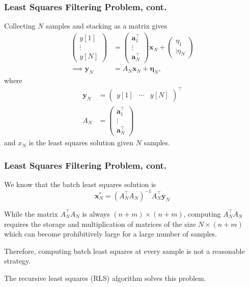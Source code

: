 \documentclass{beamer}
\begin{document}
\begin{frame}\frametitle{Least Squares Filtering Problem, cont.}

Collecting $N$ samples and stacking as a matrix gives
\begin{align*}
\begin{pmatrix} y[1] \\ \vdots \\ y[N] \end{pmatrix} &= \begin{pmatrix} \mathbf{a}_1^\top \\ \vdots \\ \mathbf{a}_N^\top\end{pmatrix}\mathbf{x}_N + \begin{pmatrix} \eta_1 \\ \vdots \eta_N \end{pmatrix} \\
\implies \mathbf{y}_N &= A_N \mathbf{x}_N + \boldsymbol{\eta}_N,
\end{align*}
where
\begin{align*}
	\mathbf{y}_N &= \begin{pmatrix} y[1] & \cdots & y[N] \end{pmatrix}^\top \\
	A_N &= \begin{pmatrix} \mathbf{a}_1^\top \\ \vdots \\ \mathbf{a}_N^\top\end{pmatrix}
\end{align*}
and $x_N$ is the least squares solution given $N$ samples.

\end{frame}

\begin{frame}\frametitle{Least Squares Filtering Problem, cont.}

We know that the batch least squares solution is
\[
\mathbf{x}_N^\ast = \left(A_N^\top A_N\right)^{-1}A_N^\top \mathbf{y}_N
\]

While the matrix $A_N^\top A_N$ is always $(n+m)\times(n+m)$, computing $A_N^\top A_N$ requires the storage and multiplication of matrices of the size $N\times (n+m)$ which can become prohibitively large for a large number of samples.  

\vspace{0.5cm}

Therefore, computing batch least squares at every sample is not a reasonable strategy.

\vspace{0.5cm}

The recursive least squares (RLS) algorithm solves this problem.

\end{frame}
\end{document}
